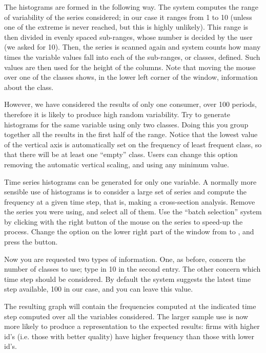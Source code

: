 \documentclass [11pt,a4paper] {book}
\begin{document}
The histograms are formed in the following way. The system computes the range of variability of the series considered; in our case it ranges from 1 to 10 (unless one of the extreme is never reached, but this is highly unlikely). This range is then divided in evenly spaced sub-ranges, whose number is decided by the user (we asked for 10). Then, the series is scanned again and system counts how many times the variable values fall into each of the sub-ranges, or classes, defined. Such values are then used for the height of the columns. Note that moving the mouse over one of the classes shows, in the lower left corner of the window, information about the class.




However, we have considered the results of only one consumer, over 100 periods, therefore it is likely to produce high random variability. Try to generate histograms for the same variable using only two classes. Doing this you group together all the results in the first half of the range. Notice that the lowest value of the vertical axis is automatically set on the frequency of least frequent class, so that there will be at least one ``empty'' class. Users can change this option removing the automatic vertical scaling, and using any minimum value.

Time series histograms can be generated for only one variable. A normally more sensible use of histograms is to consider a large set of series and compute the frequency at a given time step, that is, making a cross-section analysis. Remove the series you were using, and select all of them. Use the ``batch selection'' system by clicking with the right button of the mouse on the series to speed-up the process. Change the option on the lower right part of the window from  to , and press the  button.

Now you are requested two types of information. One, as before, concern the number of classes to use; type in 10 in the second entry. The other concern which time step should be considered. By default the system suggests the latest time step available, 100 in our case, and you can leave this value.

The resulting graph will contain the frequencies computed at the indicated time step computed over all the variables considered. The larger sample use is now more likely to produce a representation to the expected results: firms with higher id's (i.e. those with better quality) have higher frequency than those with lower id's.
\end{document}
